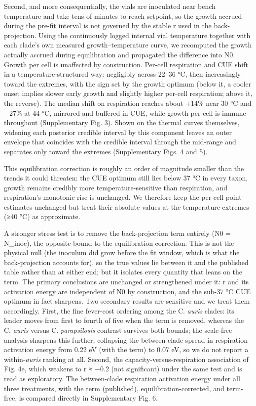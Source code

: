 \documentclass[
]{article}
\begin{document}
Second, and more consequentially, the vials are inoculated near bench
temperature and take tens of minutes to reach setpoint, so the growth
accrued during the pre-fit interval is not governed by the stable r used
in the back-projection. Using the continuously logged internal vial
temperature together with each clade's own measured growth--temperature
curve, we recomputed the growth actually accrued during equilibration
and propagated the difference into N0. Growth per cell is unaffected by
construction. Per-cell respiration and CUE shift in a
temperature-structured way: negligibly across 22--36 °C, then
increasingly toward the extremes, with the sign set by the growth
optimum (below it, a cooler onset implies slower early growth and
slightly higher per-cell respiration; above it, the reverse). The median
shift on respiration reaches about +14\% near 30 °C and −27\% at 44 °C,
mirrored and buffered in CUE, while growth per cell is immune throughout
(Supplementary Fig. 3). Shown on the thermal curves themselves, widening
each posterior credible interval by this component leaves an outer
envelope that coincides with the credible interval through the mid-range
and separates only toward the extremes (Supplementary Figs. 4 and 5).

This equilibration correction is roughly an order of magnitude smaller
than the trends it could threaten: the CUE optimum still lies below 37
°C in every taxon, growth remains credibly more temperature-sensitive
than respiration, and respiration's monotonic rise is unchanged. We
therefore keep the per-cell point estimates unchanged but treat their
absolute values at the temperature extremes (≥40 °C) as approximate.

A stronger stress test is to remove the back-projection term entirely
(N0 = N\_inoc), the opposite bound to the equilibration correction. This
is not the physical null (the inoculum did grow before the fit window,
which is what the back-projection accounts for), so the true values lie
between it and the published table rather than at either end; but it
isolates every quantity that leans on the term. The primary conclusions
are unchanged or strengthened under it: r and its activation energy are
independent of N0 by construction, and the sub-37 °C CUE optimum in fact
sharpens. Two secondary results are sensitive and we treat them
accordingly. First, the fine fever-cost ordering among the C.
\emph{auris} clades: its leader moves from first to fourth of five when
the term is removed, whereas the C. \emph{auris} versus C.
\emph{parapsilosis} contrast survives both bounds; the scale-free
analysis sharpens this further, collapsing the between-clade spread in
respiration activation energy from 0.22 eV (with the term) to 0.07 eV,
so we do not report a within-\emph{auris} ranking at all. Second, the
capacity-versus-respiration association of Fig. 4e, which weakens to r ≈
−0.2 (not significant) under the same test and is read as exploratory.
The between-clade respiration activation energy under all three
treatments, with the term (published), equilibration-corrected, and
term-free, is compared directly in Supplementary Fig. 6.
\end{document}
